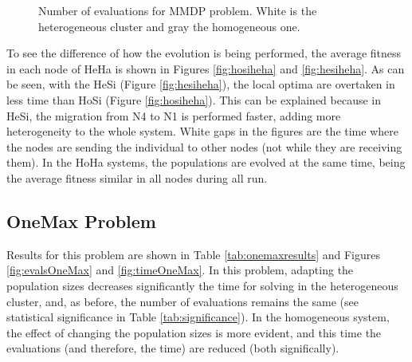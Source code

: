 \documentclass{sig-alternate}
\begin{document}
\begin{figure}
\centering
{}
\caption{Number of evaluations for MMDP problem. White is the heterogeneous cluster and gray the homogeneous one.}
\label{fig:evalsMMDP}
\end{figure}

To see the difference of how the evolution is being performed, the average fitness in each node of HeHa is shown in Figures \ref{fig:hosiheha} and \ref{fig:hesiheha}. As can be seen, with the HeSi (Figure \ref{fig:hesiheha}), the local optima are overtaken in less time than HoSi (Figure \ref{fig:hosiheha}).  This can be explained because in HeSi, the migration from N4 to N1 is performed faster, adding more heterogeneity to the whole system. White gaps in the figures are the time where the nodes are sending the individual to other nodes (not while they are receiving them). In the HoHa systems, the populations are evolved at the same time, being the average fitness similar in all nodes during all run. %


\begin{figure*}
\centering
{}
\caption{Average fitness in the first 1000 milliseconds of execution of the four nodes of the heterogeneous cluster with the same population sizes (HoSi/HeHa) for the MMDP problem.}
\label{fig:hosiheha}
\end{figure*}

\begin{figure*}
\centering
{} %
\caption{Average fitness in the first 1000 milliseconds of execution of the four nodes of the heterogeneous cluster with different population sizes (HeSi/HeHa) for the MMDP problem.}
\label{fig:hesiheha}
\end{figure*}



\subsection{OneMax Problem}

Results for this problem are shown in Table \ref{tab:onemaxresults} and Figures \ref{fig:evalsOneMax} and \ref{fig:timeOneMax}. In this problem, adapting the population sizes decreases significantly the time for solving in the heterogeneous cluster, and, as before, the number of evaluations remains the same (see statistical significance in Table \ref{tab:significance}). In the homogeneous system, the effect of changing the population sizes is more evident, and this time the evaluations (and therefore, the time) are reduced (both significally). 
\end{document}
